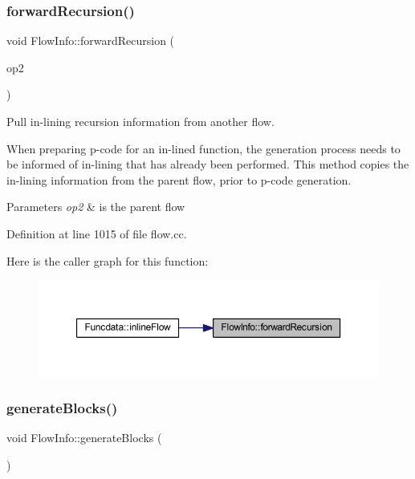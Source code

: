 \mbox{\label{class_flow_info_a47f656fb99cdb06587c0e86d86a6ff84}} 
\subsubsection{\texorpdfstring{forwardRecursion()}{forwardRecursion()}}
{\footnotesize\ttfamily void Flow\+Info\+::forward\+Recursion (\begin{DoxyParamCaption}\item[{const \mbox{\hyperlink{class_flow_info}{Flow\+Info}} \&}]{op2 }\end{DoxyParamCaption})}



Pull in-\/lining recursion information from another flow. 

When preparing p-\/code for an in-\/lined function, the generation process needs to be informed of in-\/lining that has already been performed. This method copies the in-\/lining information from the parent flow, prior to p-\/code generation. 
\begin{DoxyParams}{Parameters}
{\em op2} & is the parent flow \\
\hline
\end{DoxyParams}


Definition at line 1015 of file flow.\+cc.

Here is the caller graph for this function\+:
\nopagebreak
\begin{figure}[H]
\begin{center}
\leavevmode
\includegraphics[width=350pt]{class_flow_info_a47f656fb99cdb06587c0e86d86a6ff84_icgraph}
\end{center}
\end{figure}
\mbox{\label{class_flow_info_a5c8f51cb6c88719657801a2f26e87fae}} 
\subsubsection{\texorpdfstring{generateBlocks()}{generateBlocks()}}
{\footnotesize\ttfamily void Flow\+Info\+::generate\+Blocks (\begin{DoxyParamCaption}\item[{void}]{ }\end{DoxyParamCaption})}




